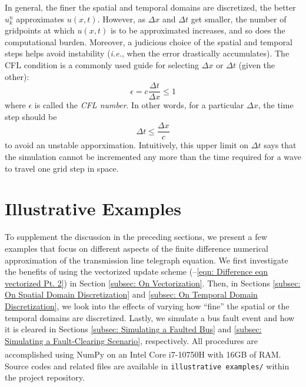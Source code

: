\documentclass{article}
\begin{document}
In general, the finer the spatial and temporal domains are discretized, the better $u_{k}^{n}$ approximates $u \left(x,t\right)$.
However, as $\Delta x$ and $\Delta t$ get smaller, the number of gridpoints at which $u\left(x,t\right)$ is to be approximated increases,
and so does the computational burden.
Moreover, a judicious choice of the spatial and temporal steps helps avoid instability
(\textit{i.e.}, when the error drastically accumulates).
The CFL condition is a commonly used guide for selecting $\Delta x$ or $\Delta t$ (given the other):
\begin{equation}
   \label{eqn: CFL condition}
   \epsilon = c \frac{\Delta t}{\Delta x} \leq 1
\end{equation}
where $\epsilon$ is called the \textit{CFL number}.
In other words, for a particular $\Delta x$, the time step should be
\begin{equation*}
   \Delta t \leq \frac{\Delta x}{c}
\end{equation*}
to avoid an unstable apporximation.
Intuitively, this upper limit on $\Delta t$ says that the simulation cannot be incremented any more than the time required
for a wave to travel one grid step in space.

\section{Illustrative Examples}
\label{sec: Illustrative Examples}

To supplement the discussion in the preceding sections, we present a few examples that focus on different aspects of
the finite difference numerical approximation of the transmission line telegraph equation.
We first investigate the benefits of using the vectorized update scheme
(--\ref{eqn: Difference eqn vectorized Pt. 2})
in Section \ref{subsec: On Vectorization}.
Then, in Sections \ref{subsec: On Spatial Domain Discretization} and \ref{subsec: On Temporal Domain Discretization},
we look into the effects of varying how ``fine'' the spatial or the temporal domains are discretized.
Lastly, we simulate a bus fault event and how it is cleared in Sections
\ref{subsec: Simulating a Faulted Bus} and \ref{subsec: Simulating a Fault-Clearing Scenario}, respectively.
All procedures are accomplished using NumPy \citep{NumPy2020} on an
Intel\textsuperscript{\textregistered} Core\textsuperscript{\texttrademark} i7-10750H with 16GB of RAM.
Source codes and related files are available in
{\tt illustrative examples/}
within the project repository.
\end{document}
